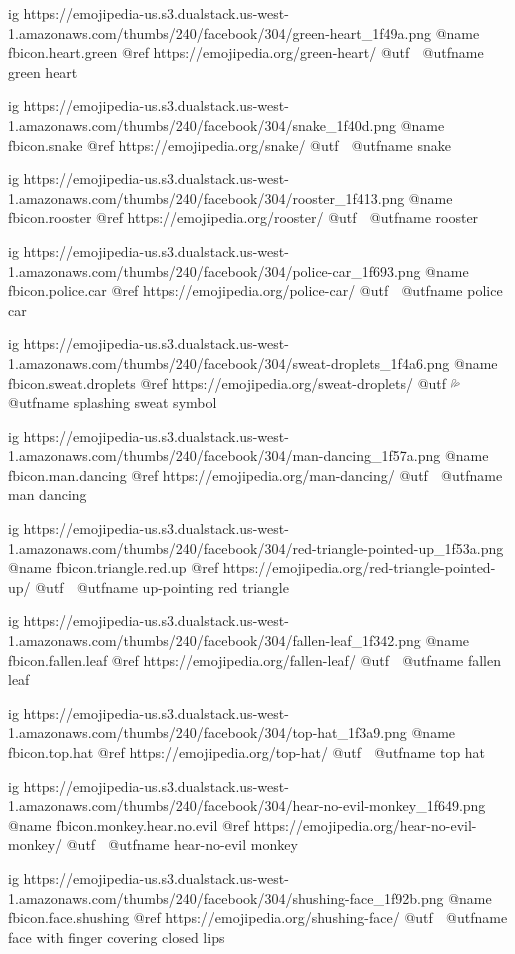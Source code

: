   ig https://emojipedia-us.s3.dualstack.us-west-1.amazonaws.com/thumbs/240/facebook/304/green-heart_1f49a.png
  @name fbicon.heart.green 
  @ref https://emojipedia.org/green-heart/
  @utf 💚
  @utfname green heart

  ig https://emojipedia-us.s3.dualstack.us-west-1.amazonaws.com/thumbs/240/facebook/304/snake_1f40d.png
  @name fbicon.snake
  @ref https://emojipedia.org/snake/
  @utf 🐍
  @utfname snake

  ig https://emojipedia-us.s3.dualstack.us-west-1.amazonaws.com/thumbs/240/facebook/304/rooster_1f413.png
  @name fbicon.rooster
  @ref https://emojipedia.org/rooster/
  @utf 🐓
  @utfname rooster

  ig https://emojipedia-us.s3.dualstack.us-west-1.amazonaws.com/thumbs/240/facebook/304/police-car_1f693.png
  @name fbicon.police.car
  @ref https://emojipedia.org/police-car/
  @utf 🚓
  @utfname police car

  ig https://emojipedia-us.s3.dualstack.us-west-1.amazonaws.com/thumbs/240/facebook/304/sweat-droplets_1f4a6.png
  @name fbicon.sweat.droplets
  @ref https://emojipedia.org/sweat-droplets/
  @utf 💦
  @utfname splashing sweat symbol

  ig https://emojipedia-us.s3.dualstack.us-west-1.amazonaws.com/thumbs/240/facebook/304/man-dancing_1f57a.png
  @name fbicon.man.dancing
  @ref https://emojipedia.org/man-dancing/
  @utf 🕺
  @utfname man dancing

  ig https://emojipedia-us.s3.dualstack.us-west-1.amazonaws.com/thumbs/240/facebook/304/red-triangle-pointed-up_1f53a.png
  @name fbicon.triangle.red.up
  @ref https://emojipedia.org/red-triangle-pointed-up/
  @utf 🔺
  @utfname up-pointing red triangle

  ig https://emojipedia-us.s3.dualstack.us-west-1.amazonaws.com/thumbs/240/facebook/304/fallen-leaf_1f342.png
  @name fbicon.fallen.leaf
  @ref https://emojipedia.org/fallen-leaf/
  @utf 🍂
  @utfname fallen leaf

  ig https://emojipedia-us.s3.dualstack.us-west-1.amazonaws.com/thumbs/240/facebook/304/top-hat_1f3a9.png
  @name fbicon.top.hat
  @ref https://emojipedia.org/top-hat/
  @utf 🎩
  @utfname top hat

  ig https://emojipedia-us.s3.dualstack.us-west-1.amazonaws.com/thumbs/240/facebook/304/hear-no-evil-monkey_1f649.png
  @name fbicon.monkey.hear.no.evil
  @ref https://emojipedia.org/hear-no-evil-monkey/
  @utf 🙉
  @utfname hear-no-evil monkey

  ig https://emojipedia-us.s3.dualstack.us-west-1.amazonaws.com/thumbs/240/facebook/304/shushing-face_1f92b.png
  @name fbicon.face.shushing
  @ref https://emojipedia.org/shushing-face/
  @utf 🤫
  @utfname face with finger covering closed lips

